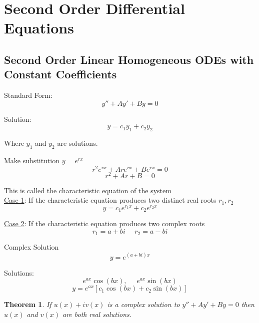 \documentclass[12pt]{article}
\numberwithin{equation}{subsection}
\newtheorem{theorem}{Theorem}[section]
\newcommand{\sinp}[1]{\sin\left( #1 \right)}
\newcommand{\cosp}[1]{\cos\left( #1 \right)}
\newcommand{\indg}{\hspace{3.5cm}}
\begin{document}
\newpage
\section{Second Order Differential Equations}
\subsection{Second Order Linear Homogeneous ODEs with Constant Coefficients}
Standard Form:
\begin{equation}
y''+Ay'+By=0
\end{equation}

Solution:
\begin{equation}
y=c_1y_1+c_2y_2
\end{equation}

\indg Where $y_1$ and $y_2$ are solutions.

\bigskip

Make substitution $y=e^{rx}$
\begin{equation}
r^2e^{rx}+Are^{rx}+Be^{rx}=0
\end{equation}
\begin{equation}
r^2+Ar+B=0
\end{equation}

This is called the characteristic equation of the system\\

\noindent \underline{Case 1}: If the characteristic equation produces two distinct real roots $r_1, r_2$
\begin{equation}
y=c_1e^{r_1x}+c_2e^{r_2x}
\end{equation}

\noindent \underline{Case 2}: If the characteristic equation produces two complex roots $$ r_1=a+bi \ \ \ \ \ \ r_2=a-bi$$ 

Complex Solution
\begin{equation}
y=e^{(a+bi)x}
\end{equation}

Solutions:
\begin{equation}
e^{ax}\cosp{bx}, \ \ \ \ \ \ e^{ax}\sinp{bx}
\end{equation}
\begin{equation}
y=e^{ax}[c_1\cosp{bx}+c_2\sinp{bx}]
\end{equation}

\begin{theorem}
If $u(x)+iv(x)$ is a complex solution to $y''+Ay'+By=0$ then $u(x)$ and $v(x)$ are both real solutions.
\end{theorem}
\end{document}

